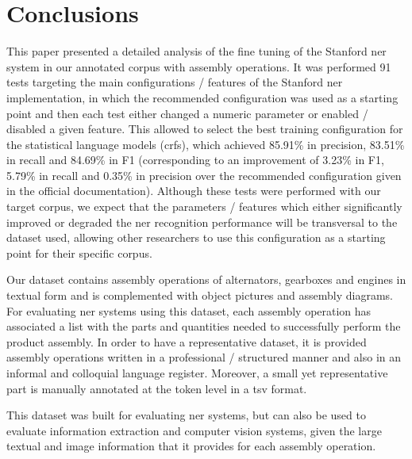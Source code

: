 \section{Conclusions}\label{sec:conclusions}

This paper presented a detailed analysis of the fine tuning of the Stanford \gls{ner} system in our annotated corpus with assembly operations. It was performed 91 tests targeting the main configurations / features of the Stanford \gls{ner} implementation, in which the recommended configuration was used as a starting point and then each test either changed a numeric parameter or enabled / disabled a given feature. This allowed to select the best training configuration for the statistical language models (\glspl{crf}), which achieved 85.91\% in precision, 83.51\% in recall and 84.69\% in F1 (corresponding to an improvement of 3.23\% in F1, 5.79\% in recall and 0.35\% in precision over the recommended configuration given in the official documentation). Although these tests were performed with our target corpus, we expect that the parameters / features which either significantly improved or degraded the \gls{ner} recognition performance will be transversal to the dataset used, allowing other researchers to use this configuration as a starting point for their specific corpus.

Our dataset contains assembly operations of alternators, gearboxes and engines in textual form and is complemented with object pictures and assembly diagrams. For evaluating \gls{ner} systems using this dataset, each assembly operation has associated a list with the parts and quantities needed to successfully perform the product assembly. In order to have a representative dataset, it is provided assembly operations written in a professional / structured manner and also in an informal and colloquial language register. Moreover, a small yet representative part is manually annotated at the token level in a \gls{tsv} format.

This dataset was built for evaluating \gls{ner} systems, but can also be used to evaluate information extraction and computer vision systems, given the large textual and image information that it provides for each assembly operation.
